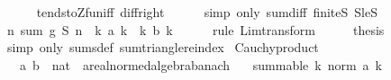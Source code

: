 \begin{isabellebody}
\ \ \ \ \isamarkupfalse%
\ tendsto{\isacharunderscore}{\kern0pt}Zfun{\isacharunderscore}{\kern0pt}iff\ diff{\isacharunderscore}{\kern0pt}{}{\isacharunderscore}{\kern0pt}right\isanewline
\ \ \ \ \isamarkupfalse%
\ {\isacharparenleft}{\kern0pt}simp\ only{\isacharcolon}{\kern0pt}\ sum{\isacharunderscore}{\kern0pt}diff\ finite{\isacharunderscore}{\kern0pt}S{}\ S{}{\isacharunderscore}{\kern0pt}le{\isacharunderscore}{\kern0pt}S{}{\isacharparenright}{\kern0pt}\isanewline
\ \ \isamarkupfalse%
\ {}\ \isamarkupfalse%
\ {\isachardoublequoteopen}{\isacharparenleft}{\kern0pt}{\isasymlambda}n{\isachardot}{\kern0pt}\ sum\ {\isacharquery}{\kern0pt}g\ {\isacharparenleft}{\kern0pt}{\isacharquery}{\kern0pt}S{}\ n{\isacharparenright}{\kern0pt}{\isacharparenright}{\kern0pt}\ {\isasymlonglonglongrightarrow}\ {\isacharparenleft}{\kern0pt}{\isasymSum}k{\isachardot}{\kern0pt}\ a\ k{\isacharparenright}{\kern0pt}\ {\isacharasterisk}{\kern0pt}\ {\isacharparenleft}{\kern0pt}{\isasymSum}k{\isachardot}{\kern0pt}\ b\ k{\isacharparenright}{\kern0pt}{\isachardoublequoteclose}\isanewline
\ \ \ \ \isamarkupfalse%
\ {\isacharparenleft}{\kern0pt}rule\ Lim{\isacharunderscore}{\kern0pt}transform{}{\isacharparenright}{\kern0pt}\isanewline
\ \ \isamarkupfalse%
\ \isamarkupfalse%
\ {\isacharquery}{\kern0pt}thesis\isanewline
\ \ \ \ \isamarkupfalse%
\ {\isacharparenleft}{\kern0pt}simp\ only{\isacharcolon}{\kern0pt}\ sums{\isacharunderscore}{\kern0pt}def\ sum{\isachardot}{\kern0pt}triangle{\isacharunderscore}{\kern0pt}reindex{\isacharparenright}{\kern0pt}\isanewline
{}\isamarkupfalse%
%
\endisatagproof
{\isafoldproof}%
%
\isadelimproof
\isanewline
%
\endisadelimproof
\isanewline
{}\isamarkupfalse%
\ Cauchy{\isacharunderscore}{\kern0pt}product{\isacharcolon}{\kern0pt}\isanewline
\ \ \ a\ b\ {\isacharcolon}{\kern0pt}{\isacharcolon}{\kern0pt}\ {\isachardoublequoteopen}nat\ {\isasymRightarrow}\ {\isacharprime}{\kern0pt}a{\isacharcolon}{\kern0pt}{\isacharcolon}{\kern0pt}{\isacharbraceleft}{\kern0pt}real{\isacharunderscore}{\kern0pt}normed{\isacharunderscore}{\kern0pt}algebra{\isacharcomma}{\kern0pt}banach{\isacharbraceright}{\kern0pt}{\isachardoublequoteclose}\isanewline
\ \ \ {\isachardoublequoteopen}summable\ {\isacharparenleft}{\kern0pt}{\isasymlambda}k{\isachardot}{\kern0pt}\ norm\ {\isacharparenleft}{\kern0pt}a\ k{\isacharparenright}{\kern0pt}{\isacharparenright}{\kern0pt}{\isachardoublequoteclose}\isanewline

\end{isabellebody}
